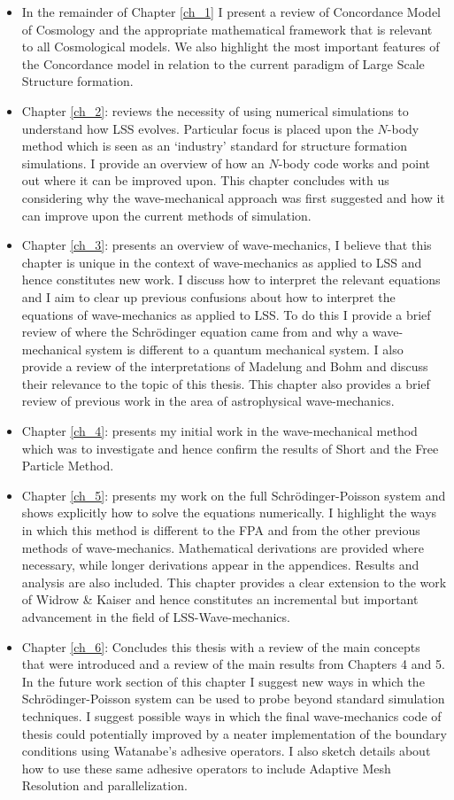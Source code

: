 \begin{itemize}
\item In the remainder of Chapter \ref{ch_1} I present a review of Concordance Model of Cosmology and the appropriate mathematical framework that is relevant to all Cosmological models. We also highlight the most important features of the Concordance model in relation to the current paradigm of Large Scale Structure formation.
\item Chapter \ref{ch_2}: reviews the necessity of using numerical simulations to understand how LSS evolves. Particular focus is placed upon the $N$-body method which is seen as an `industry' standard for structure formation simulations. I provide an overview of how an $N$-body code works and point out where it can be improved upon. This chapter concludes with us considering why the wave-mechanical approach was first suggested and how it can improve upon the current methods of simulation.
\item Chapter \ref{ch_3}: presents an overview of wave-mechanics, I believe that this chapter is unique in the context of wave-mechanics as applied to LSS and hence constitutes new work. I discuss how to interpret the relevant equations and I aim to clear up previous confusions about how to interpret the equations of wave-mechanics as applied to LSS. To do this I provide a brief review of where the Schr\"odinger equation came from and why a wave-mechanical system is different to a quantum mechanical system. I also provide a review of the interpretations of Madelung and Bohm and discuss their relevance to the topic of this thesis. This chapter also provides a brief review of previous work in the area of astrophysical wave-mechanics.
\item Chapter \ref{ch_4}: presents my initial work in the wave-mechanical method which was to investigate and hence confirm the results of Short and the Free Particle Method.
\item Chapter \ref{ch_5}: presents my work on the full Schr\"odinger-Poisson system and shows explicitly how to solve the equations numerically. I highlight the ways in which this method is different to the FPA and from the other previous methods of wave-mechanics. Mathematical derivations are provided where necessary, while longer derivations appear in the appendices. Results and analysis are also included. This chapter provides a clear extension to the work of Widrow \& Kaiser and hence constitutes an incremental but important advancement in the field of LSS-Wave-mechanics.
\item Chapter \ref{ch_6}: Concludes this thesis with a review of the main concepts that were introduced and a review of the main results from Chapters 4 and 5. In the future work section of this chapter I suggest new ways in which the Schr\"odinger-Poisson system can be used to probe beyond standard simulation techniques. I suggest possible ways in which the final wave-mechanics code of thesis could potentially improved by a neater implementation of the boundary conditions using Watanabe's adhesive operators. I also sketch details about how to use these same adhesive operators to include Adaptive Mesh Resolution and parallelization.

\end{itemize}
